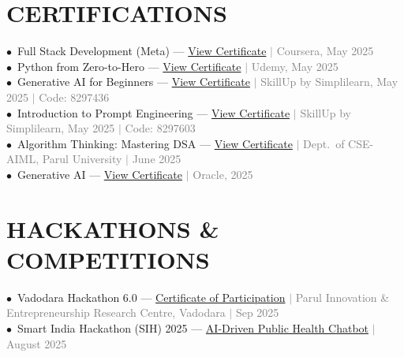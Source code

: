 \documentclass[a4paper,10pt]{article}
\begin{document}
\section{CERTIFICATIONS}
\vspace{2pt}
\small
$\bullet$~Full Stack Development (Meta) ---
  \href{https://coursera.org/verify/P9S8LC23XBWL}{View Certificate}
  \textcolor{graytext}{$|$ Coursera, May 2025}\\[3pt]
$\bullet$~Python from Zero-to-Hero ---
  \href{https://drive.google.com/file/d/1sHXVgnp1mGbrP9o17WQXciCU43bGCxo8/view?usp=drive_link}{View Certificate}
  \textcolor{graytext}{$|$ Udemy, May 2025}\\[3pt]
$\bullet$~Generative AI for Beginners ---
  \href{https://drive.google.com/file/d/1IGowPQm8p0gBpowk9EqmXRQtfeN5-dtY/view?usp=drive_link}{View Certificate}
  \textcolor{graytext}{$|$ SkillUp by Simplilearn, May 2025 $|$ Code: 8297436}\\[3pt]
$\bullet$~Introduction to Prompt Engineering ---
  \href{https://drive.google.com/file/d/1KX7hNBRy2jBhX0FYq71vQosTgnYjMJ8K/view?usp=drive_link}{View Certificate}
  \textcolor{graytext}{$|$ SkillUp by Simplilearn, May 2025 $|$ Code: 8297603}\\[3pt]
$\bullet$~Algorithm Thinking: Mastering DSA ---
  \href{https://drive.google.com/file/d/1UL8Btv7IMVAnsLe35U3SeAkRNJhV4tQD/view?usp=drive_link}{View Certificate}
  \textcolor{graytext}{$|$ Dept.\ of CSE-AIML, Parul University $|$ June 2025}\\[3pt]
$\bullet$~Generative AI --- 
  \href{https://drive.google.com/file/d/1taS4O9LJXNZyQS2YorCtTu_HTCBBn3wT/view?usp=drive_link}{View Certificate}
  \textcolor{graytext}{$|$ Oracle, 2025}


\section{HACKATHONS \& COMPETITIONS}
\vspace{2pt}
\small
$\bullet$~Vadodara Hackathon 6.0 ---
  \href{https://drive.google.com/file/d/1GddzsLH7jMgIva0xKu67fhe7pHxxerUL/view?usp=drive_link}{Certificate of Participation}
  \textcolor{graytext}{$|$ Parul Innovation \& Entrepreneurship Research Centre, Vadodara $|$ Sep 2025}\\[3pt]
$\bullet$~Smart India Hackathon (SIH) 2025 ---
  \href{https://github.com/Abhisly/AI-HEALTH-CHATBOT}{AI-Driven Public Health Chatbot}
  \textcolor{graytext}{$|$ August 2025}

\end{document}
